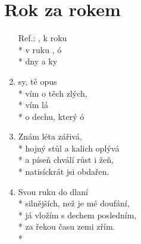 \section{Rok za rokem}
\begin{enumerate}
\item[Ref.:]     , k roku  \\*
v ruku , ó      \\*
 dny a ky  
\item {} sy,  tě  opus \\*
vím o těch  zlých, \\*
vím  lá \\*
 o dechu, který  ó
\item Znám léta zářivá,\\*
hojný stůl a kalich oplývá\\*
a píseň chválí růst i žeň,\\*
natisíckrát jsi obdařen. 
\item Svou ruku do dlaní\\*
silnějších, než je mé doufání,\\*
já vložím s dechem posledním,\\*
za řekou času zemi zřím. \\*
\end{enumerate}
